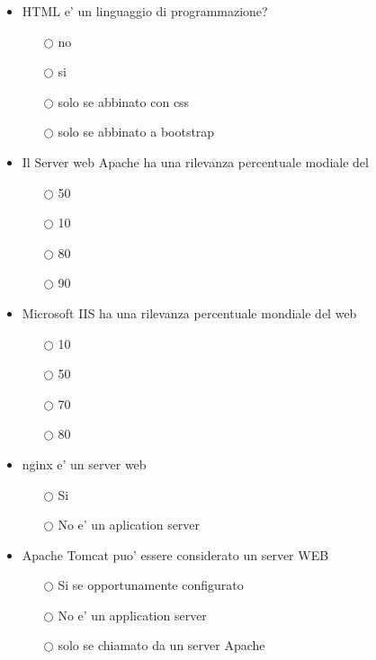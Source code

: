 \documentclass[10pt,twocolumn]{article}
\begin{document}
\begin{itemize}
    \item HTML e' un linguaggio di programmazione?
          \begin{itemize}
              \item[$\bigcirc$] no
              \item[$\bigcirc$] si
              \item[$\bigcirc$] solo se abbinato con css
              \item[$\bigcirc$] solo se abbinato a bootstrap
          \end{itemize}
\end{itemize}
\begin{itemize}
    \item Il Server web Apache ha una rilevanza percentuale modiale del
          \begin{itemize}
              \item[$\bigcirc$] 50
              \item[$\bigcirc$] 10
              \item[$\bigcirc$] 80
              \item[$\bigcirc$] 90
          \end{itemize}
\end{itemize}
\begin{itemize}
    \item Microsoft IIS ha una rilevanza percentuale mondiale del web
          \begin{itemize}
              \item[$\bigcirc$] 10
              \item[$\bigcirc$] 50
              \item[$\bigcirc$] 70
              \item[$\bigcirc$] 80
          \end{itemize}
\end{itemize}
\begin{itemize}
    \item nginx e' un server web
          \begin{itemize}
              \item[$\bigcirc$] Si
              \item[$\bigcirc$] No e' un aplication server
          \end{itemize}
\end{itemize}
\begin{itemize}
    \item Apache Tomcat puo' essere considerato un server WEB
          \begin{itemize}
              \item[$\bigcirc$] Si se opportunamente configurato
              \item[$\bigcirc$] No e' un application server
              \item[$\bigcirc$] solo se chiamato da un server Apache
          \end{itemize}
\end{itemize}
\end{document}

